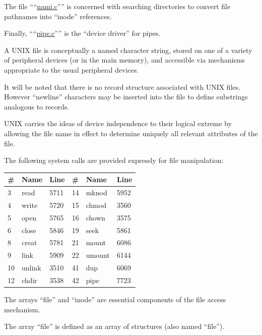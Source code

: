 The file ````\href{./v6/ken/nami.c}{nami.c}'''' is concerned with
searching directories to convert file
pathnames into ``inode'' references.

Finally, ````\href{./v6/ken/pipe.c}{pipe.c}'''' is the ``device
driver'' for pipes.



A UNIX file is conceptually a named
character string, stored on one of a
variety of peripheral devices (or in
the main memory), and accessible via
mechanisms appropriate to the usual
peripheral devices.

It will be noted that there is no
record structure associated with UNIX
files. However ``newline'' characters may
be inserted into the file to define
substrings analogous to records.
 
UNIX carries the ideas of device
independence to their logical extreme
by allowing the file name in effect to
determine uniquely all relevant attributes of the file.



The following system calls are provided
expressly for file manipulation:

\begin{center}
\begin{tabular}{llllll}
{\bf \#} & {\bf Name} & {\bf Line \hspace{0.5cm}} & {\bf \#} & {\bf Name} & {\bf Line}\\ \hline
3 & read & 5711 & 14 & mknod & 5952\\
4 & write & 5720 & 15 & chmod & 3560\\
5 & open & 5765 & 16 & chown & 3575\\
6 & close & 5846 & 19 & seek & 5861\\
8 & creat & 5781 & 21 & mount & 6086\\
9 & link & 5909 & 22 & umount & 6144\\
10 & unlink & 3510 & 41 & dup & 6069\\
12 & chdir & 3538 & 42 & pipe & 7723\\
\end{tabular}
\end{center}



The arrays ``file'' and ``inode'' are
essential components of the file access
mechanism.


The array ``file'' is defined as an array
of structures (also named ``file'').

